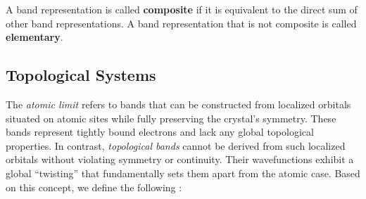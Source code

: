 \begin{definition}
A band representation is called \textbf{composite} if it is equivalent to the direct sum of other band representations. A band representation that is not composite is called \textbf{elementary}.
\end{definition}

%

%

\subsection{Topological Systems}

The \textit{atomic limit} refers to bands that can be constructed from localized orbitals situated on atomic sites while fully preserving the crystal's symmetry. These bands represent tightly bound electrons and lack any global topological properties. In contrast, \textit{topological bands} cannot be derived from such localized orbitals without violating symmetry or continuity. Their wavefunctions exhibit a global ``twisting'' that fundamentally sets them apart from the atomic case. Based on this concept, we define the following \cite{building_blocks2018}:

